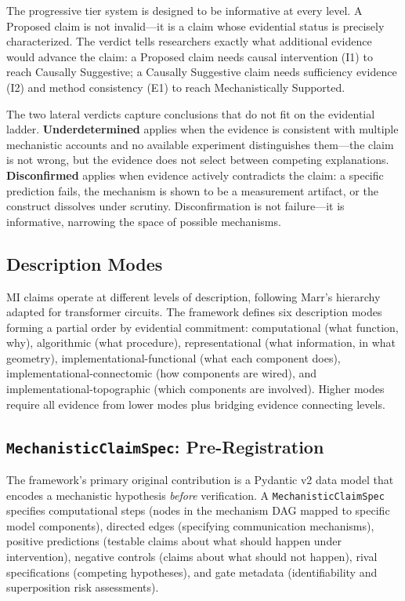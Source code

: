 \documentclass[10pt]{article}
\begin{document}
The progressive tier system is designed to be informative at every level. A Proposed claim is not invalid---it is a claim whose evidential status is precisely characterized. The verdict tells researchers exactly what additional evidence would advance the claim: a Proposed claim needs causal intervention (I1) to reach Causally Suggestive; a Causally Suggestive claim needs sufficiency evidence (I2) and method consistency (E1) to reach Mechanistically Supported.

The two lateral verdicts capture conclusions that do not fit on the evidential ladder. \textbf{Underdetermined} applies when the evidence is consistent with multiple mechanistic accounts and no available experiment distinguishes them---the claim is not wrong, but the evidence does not select between competing explanations. \textbf{Disconfirmed} applies when evidence actively contradicts the claim: a specific prediction fails, the mechanism is shown to be a measurement artifact, or the construct dissolves under scrutiny. Disconfirmation is not failure---it is informative, narrowing the space of possible mechanisms.

\subsection{Description Modes}
\label{sec:description-modes}

MI claims operate at different levels of description, following Marr's hierarchy adapted for transformer circuits. The framework defines six description modes forming a partial order by evidential commitment: computational (what function, why), algorithmic (what procedure), representational (what information, in what geometry), implementational-functional (what each component does), implementational-connectomic (how components are wired), and implementational-topographic (which components are involved). Higher modes require all evidence from lower modes plus bridging evidence connecting levels.

\subsection{\texttt{MechanisticClaimSpec}: Pre-Registration}
\label{sec:claimspec}

The framework's primary original contribution is a Pydantic v2 data model that encodes a mechanistic hypothesis \emph{before} verification. A \texttt{MechanisticClaimSpec} specifies computational steps (nodes in the mechanism DAG mapped to specific model components), directed edges (specifying communication mechanisms), positive predictions (testable claims about what should happen under intervention), negative controls (claims about what should not happen), rival specifications (competing hypotheses), and gate metadata (identifiability and superposition risk assessments).
\end{document}
